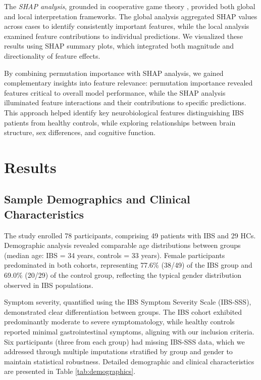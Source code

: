 \documentclass[diagnostics,article,accept,pdftex,moreauthors]{Definitions/mdpi}
\begin{document}
The \textit{SHAP analysis}, grounded in cooperative game theory \cite{lundberg2020local}, provided both global and local interpretation frameworks. The global analysis aggregated SHAP values across cases to identify consistently important features, while the local analysis examined feature contributions to individual predictions. We visualized these results using SHAP summary plots, which integrated both magnitude and directionality of feature effects.

By combining permutation importance with SHAP analysis, we gained complementary insights into feature relevance: permutation importance revealed features critical to overall model performance, while the SHAP analysis illuminated feature interactions and their contributions to specific predictions. This approach helped identify key neurobiological features distinguishing IBS patients from healthy controls, while exploring relationships between brain structure, sex differences, and cognitive function.

\section{Results}



\subsection{Sample Demographics and Clinical Characteristics}

The study enrolled 78 participants, comprising 49 patients with IBS and 29 HCs. Demographic analysis revealed comparable age distributions between groups (median age: IBS = 34 years, controls = 33 years). Female participants predominated in both cohorts, representing 77.6\% (38/49) of the IBS group and 69.0\% (20/29) of the control group, reflecting the typical gender distribution observed in IBS populations.

Symptom severity, quantified using the IBS Symptom Severity Scale (IBS-SSS), demonstrated clear differentiation between groups. The IBS cohort exhibited predominantly moderate to severe symptomatology, while healthy controls reported minimal gastrointestinal symptoms, aligning with our inclusion criteria. Six participants (three from each group) had missing IBS-SSS data, which we addressed through multiple imputations stratified by group and gender to maintain statistical robustness. Detailed demographic and clinical characteristics are presented in Table \ref{tab:demographics}.
\end{document}
